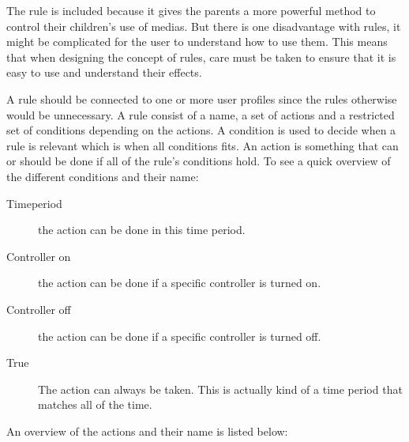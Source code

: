 The rule is included because it gives the parents a more powerful method to control their children's use of medias. 
But there is one disadvantage with rules, it might be complicated for the user to understand how to use them. 
This means that when designing the concept of rules, care must be taken to ensure that it is easy to use and understand their effects.

A rule should be connected to one or more user profiles since the rules otherwise would be unnecessary. A rule consist of a name, a set of actions and  a restricted set of conditions depending on the actions. A condition is used to decide when a rule is relevant which is when all conditions fits. An action is something that can or should be done if all of the rule's conditions hold.
To see a quick overview of the different conditions and their name:

\begin{description}
	\item[Timeperiod] the action can be done in this time period.%
	\item[Controller on] the action can be done if a specific controller is turned on. 
	\item[Controller off] the action can be done if a specific controller is turned off. 
	\item[True] The action can always be taken. This is actually kind of a time period that matches all of the time.
\end{description}

An overview of the actions and their name is listed below:

